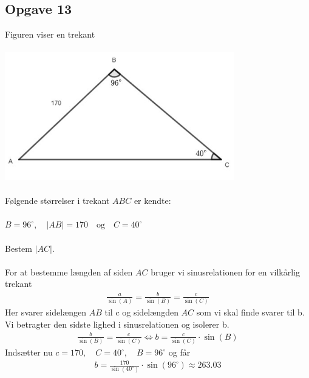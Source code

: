 \subsection{Opgave 13}

Figuren viser en trekant\\\\
\includegraphics[width=10cm]{Opgave_11-20/Opgave_13/Opgave_13.jpg}\\\\
Følgende størrelser i trekant $ABC$ er kendte:\\\\
$B = 96^{\circ},\quad |AB| = 170\quad \text{og}\quad C = 40^{\circ}$\\\\

Bestem $|AC|$.\\\\

\ans
For at bestemme længden af siden $AC$ bruger vi sinusrelationen for en vilkårlig trekant
\begin{align*}
    \frac{a}{\sin(A)} = \frac{b}{\sin(B)} = \frac{c}{\sin(C)}
\end{align*}
Her svarer sidelængen $AB$ til c og sidelængden $AC$ som vi skal finde svarer til b. Vi betragter den sidste lighed i sinusrelationen og isolerer b.
\begin{align*}
    \frac{b}{\sin(B)} =\frac{c}{\sin(C)} \Longleftrightarrow b = \frac{c}{\sin(C)}\cdot \sin(B)
\end{align*}
Indsætter nu $c = 170,\quad C = 40^{\circ},\quad B = 96^{\circ}$ og får 
\begin{align*}
    b = \frac{170}{\sin(40^{\circ})}\cdot \sin(96^{\circ})\approx 263.03
\end{align*}
